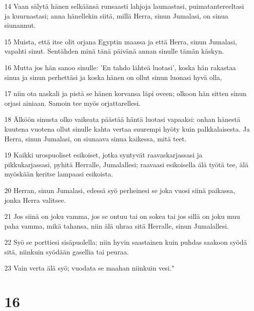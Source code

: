 \par 14 Vaan sälytä hänen selkäänsä runsaasti lahjoja laumastasi, puimatantereeltasi ja kuurnastasi; anna hänellekin siitä, millä Herra, sinun Jumalasi, on sinua siunannut.
\par 15 Muista, että itse olit orjana Egyptin maassa ja että Herra, sinun Jumalasi, vapahti sinut. Sentähden minä tänä päivänä annan sinulle tämän käskyn.
\par 16 Mutta jos hän sanoo sinulle: 'En tahdo lähteä luotasi', koska hän rakastaa sinua ja sinun perhettäsi ja koska hänen on ollut sinun luonasi hyvä olla,
\par 17 niin ota naskali ja pistä se hänen korvansa läpi oveen; olkoon hän sitten sinun orjasi ainiaan. Samoin tee myös orjattarellesi.
\par 18 Älköön sinusta olko vaikeata päästää häntä luotasi vapaaksi: onhan hänestä kuutena vuotena ollut sinulle kahta vertaa suurempi hyöty kuin palkkalaisesta. Ja Herra, sinun Jumalasi, on siunaava sinua kaikessa, mitä teet.
\par 19 Kaikki urospuoliset esikoiset, jotka syntyvät raavaskarjassasi ja pikkukarjassasi, pyhitä Herralle, Jumalallesi; raavaasi esikoisella älä työtä tee, älä myöskään keritse lampaasi esikoista.
\par 20 Herran, sinun Jumalasi, edessä syö perheinesi se joka vuosi siinä paikassa, jonka Herra valitsee.
\par 21 Jos siinä on joku vamma, jos se ontuu tai on sokea tai jos sillä on joku muu paha vamma, mikä tahansa, niin älä uhraa sitä Herralle, sinun Jumalallesi.
\par 22 Syö se porttiesi sisäpuolella; niin hyvin saastainen kuin puhdas saakoon syödä sitä, niinkuin syödään gasellia tai peuraa.
\par 23 Vain verta älä syö; vuodata se maahan niinkuin vesi."

\chapter{16}

